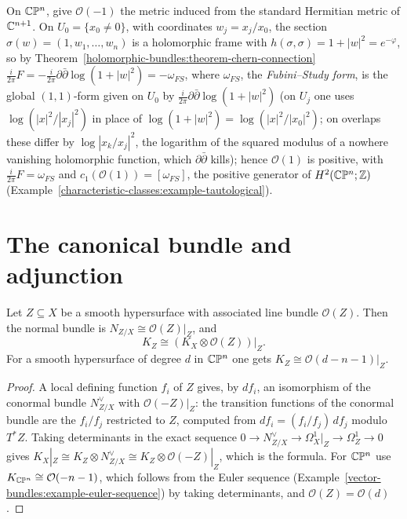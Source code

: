 \begin{example}\label{holomorphic-bundles:example-fubini-study}
On $\mathbb{C}\mathbb{P}^n$, give $\mathcal{O}(-1)$ the metric induced from the standard Hermitian metric of $\mathbb{C}^{n+1}$. On $U_0 = \{x_0 \neq 0\}$, with coordinates $w_j = x_j/x_0$, the section
$\sigma(w) = (1, w_1, \ldots, w_n)$ is a holomorphic frame with $h(\sigma, \sigma) = 1 + |w|^2 = e^{-\varphi}$, so by Theorem~\ref{holomorphic-bundles:theorem-chern-connection}
$\frac{i}{2\pi}F = -\frac{i}{2\pi}\partial\bar\partial\log(1 + |w|^2) = -\omega_{FS}$, where $\omega_{FS}$, the \emph{Fubini--Study form}, is the global $(1,1)$-form given on $U_0$ by
$\frac{i}{2\pi}\partial\bar\partial\log(1 + |w|^2)$ (on $U_j$ one uses $\log(|x|^2/|x_j|^2)$ in place of $\log(1 + |w|^2) = \log(|x|^2/|x_0|^2)$; on overlaps these differ by $\log|x_k/x_j|^2$, the logarithm of the squared modulus of a nowhere
vanishing holomorphic function, which $\partial\bar\partial$ kills); hence
$\mathcal{O}(1)$ is positive, with $\frac{i}{2\pi}F = \omega_{FS}$ and $c_1(\mathcal{O}(1)) = [\omega_{FS}]$, the positive generator of $H^2(\mathbb{C}\mathbb{P}^n; \mathbb{Z})$
(Example~\ref{characteristic-classes:example-tautological}).
\end{example}

\section{The canonical bundle and adjunction}\label{holomorphic-bundles:section-adjunction}

\begin{proposition}[Adjunction]\label{holomorphic-bundles:proposition-adjunction}
Let $Z \subseteq X$ be a smooth hypersurface with associated line bundle $\mathcal{O}(Z)$. Then the normal bundle is $N_{Z/X} \cong \mathcal{O}(Z)|_Z$, and
\[
K_Z \cong \left(K_X \otimes \mathcal{O}(Z)\right)\big|_Z .
\]
For a smooth hypersurface of degree $d$ in $\mathbb{C}\mathbb{P}^n$ one gets $K_Z \cong \mathcal{O}(d - n - 1)|_Z$.
\end{proposition}

\begin{proof}
A local defining function $f_i$ of $Z$ gives, by $df_i$, an isomorphism of the conormal bundle $N^\vee_{Z/X}$ with $\mathcal{O}(-Z)|_Z$: the transition functions of the conormal bundle are the
$f_i/f_j$ restricted to $Z$, computed from $df_i = (f_i/f_j)\,df_j$ modulo $T^*Z$. Taking determinants in the exact sequence
$0 \to N^\vee_{Z/X} \to \Omega^1_X|_Z \to \Omega^1_Z \to 0$ gives $K_X|_Z \cong K_Z \otimes N^\vee_{Z/X} \cong K_Z \otimes \mathcal{O}(-Z)|_Z$, which is the formula. For $\mathbb{C}\mathbb{P}^n$ use
$K_{\mathbb{C}\mathbb{P}^n} \cong \mathcal{O}(-n-1)$, which follows from the Euler sequence (Example~\ref{vector-bundles:example-euler-sequence}) by taking determinants, and $\mathcal{O}(Z) = \mathcal{O}(d)$.
\end{proof}

